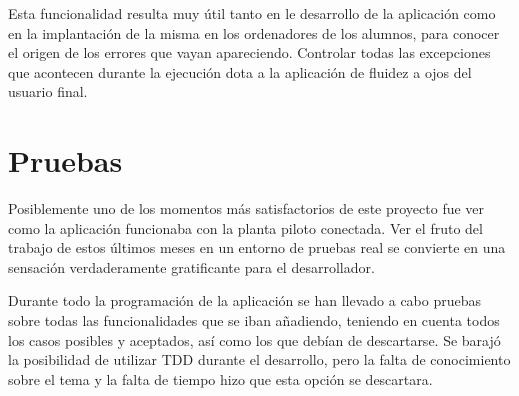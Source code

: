 Esta funcionalidad resulta muy útil tanto en le desarrollo de la aplicación como en la implantación de la misma en los ordenadores de los alumnos, para conocer el origen de los errores que vayan apareciendo. Controlar todas las excepciones que acontecen durante la ejecución dota a la aplicación de fluidez a ojos del usuario final.

\section{Pruebas}

Posiblemente uno de los momentos más satisfactorios de este proyecto fue ver como la aplicación funcionaba con la planta piloto conectada. Ver el fruto del trabajo de estos últimos meses en un entorno de pruebas real se convierte en una sensación verdaderamente gratificante para el desarrollador.

Durante todo la programación de la aplicación se han llevado a cabo pruebas sobre todas las funcionalidades que se iban añadiendo, teniendo en cuenta todos los casos posibles y aceptados, así como los que debían de descartarse. Se barajó la posibilidad de utilizar TDD durante el desarrollo, pero la falta de conocimiento sobre el tema y la falta de tiempo hizo que esta opción se descartara.
